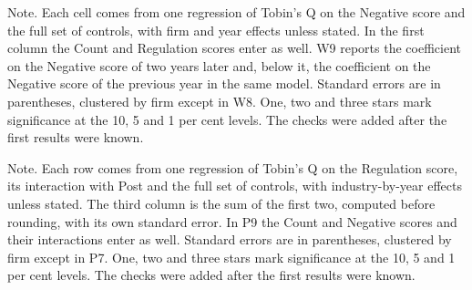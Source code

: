 \documentclass[12pt,a4paper]{article}
\newcommand{\tablenote}[1]{\par\smallskip\begin{minipage}{\linewidth}\footnotesize\setstretch{1.05}#1\end{minipage}}
\newcommand{\widetable}[1]{\resizebox{\ifdim\width>\linewidth\linewidth\else\width\fi}{!}{}}
\begin{document}
\begin{table}[!htbp]
\centering\small
\caption{Checks on the within-firm result for the Negative score}\label{tab:tonechecks}
\widetable{tables/tab_tone_checks}
\tablenote{Note. Each cell comes from one regression of Tobin's Q on the Negative score and the full set of controls, with firm and year effects unless stated. In the first column the Count and Regulation scores enter as well. W9 reports the coefficient on the Negative score of two years later and, below it, the coefficient on the Negative score of the previous year in the same model. Standard errors are in parentheses, clustered by firm except in W8. One, two and three stars mark significance at the 10, 5 and 1 per cent levels. The checks were added after the first results were known.}
\end{table}

\begin{table}[!htbp]
\centering\small
\caption{Checks on the interaction of the Regulation score with the period from fiscal year 2022}\label{tab:regchecks}
\widetable{tables/tab_regulation_checks}
\tablenote{Note. Each row comes from one regression of Tobin's Q on the Regulation score, its interaction with Post and the full set of controls, with industry-by-year effects unless stated. The third column is the sum of the first two, computed before rounding, with its own standard error. In P9 the Count and Negative scores and their interactions enter as well. Standard errors are in parentheses, clustered by firm except in P7. One, two and three stars mark significance at the 10, 5 and 1 per cent levels. The checks were added after the first results were known.}
\end{table}
\end{document}
